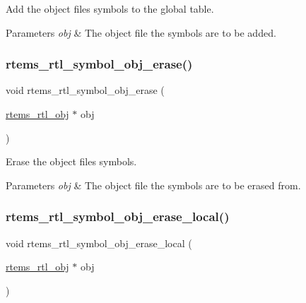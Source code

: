 Add the object file\textquotesingle{}s symbols to the global table.


\begin{DoxyParams}{Parameters}
{\em obj} & The object file the symbols are to be added. \\
\hline
\end{DoxyParams}
\mbox{\label{rtl-sym_8c_adf65b8fa73ea388857082a79e437767a}} 
\subsubsection{\texorpdfstring{rtems\_rtl\_symbol\_obj\_erase()}{rtems\_rtl\_symbol\_obj\_erase()}}
{\footnotesize\ttfamily void rtems\+\_\+rtl\+\_\+symbol\+\_\+obj\+\_\+erase (\begin{DoxyParamCaption}\item[{\mbox{\hyperlink{structrtems__rtl__obj}{rtems\+\_\+rtl\+\_\+obj}} $\ast$}]{obj }\end{DoxyParamCaption})}

Erase the object file\textquotesingle{}s symbols.


\begin{DoxyParams}{Parameters}
{\em obj} & The object file the symbols are to be erased from. \\
\hline
\end{DoxyParams}
\mbox{\label{rtl-sym_8c_a02b3a4ba7169bb4f243a5be15b301391}} 
\subsubsection{\texorpdfstring{rtems\_rtl\_symbol\_obj\_erase\_local()}{rtems\_rtl\_symbol\_obj\_erase\_local()}}
{\footnotesize\ttfamily void rtems\+\_\+rtl\+\_\+symbol\+\_\+obj\+\_\+erase\+\_\+local (\begin{DoxyParamCaption}\item[{\mbox{\hyperlink{structrtems__rtl__obj}{rtems\+\_\+rtl\+\_\+obj}} $\ast$}]{obj }\end{DoxyParamCaption})}

